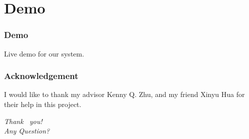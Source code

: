 \documentclass[xcolor=table,slidestop,compress,mathserif]{beamer}
\begin{document}
\section{Demo}
\begin{frame}
	\frametitle{Demo}
	Live demo for our system. 
\end{frame}
\begin{frame}
	\frametitle{Acknowledgement}
	I would like to thank my advisor Kenny Q. Zhu, and my friend Xinyu Hua for their help in this project. 
\end{frame}
\begin{frame}
  \begin{center}
    {\huge \emph{{Thank  ~you!
          \\   \vspace{1cm} Any Question?}}}
  \end{center}
\end{frame}
\end{document}
